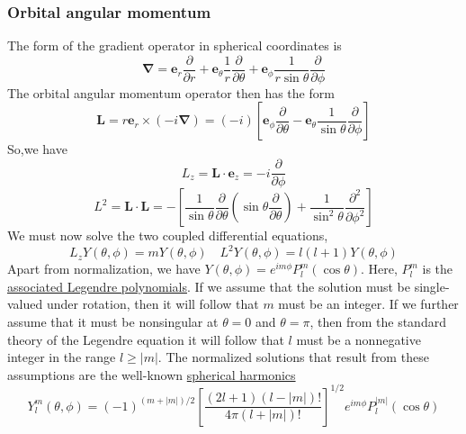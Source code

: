 \documentclass[cyan]{elegantnote}
\begin{document}
\subsubsection{Orbital angular momentum}
The form of the gradient operator in spherical coordinates is
\[\bm{\nabla} = \bm{e}_r \frac{\partial}{\partial r} + \bm{e}_{\theta} \frac{1}{r} \frac{\partial}{\partial \theta} + \bm{e}_{\phi} \frac{1}{r\sin\theta} \frac{\partial}{\partial \phi}\]
The orbital angular momentum operator then has the form
\[\bm{L} = r\bm{e}_r \times (-i\bm{\nabla}) = (-i) \left[ \bm{e}_{\phi} \frac{\partial}{\partial \theta} - \bm{e}_{\theta} \frac{1}{\sin\theta} \frac{\partial}{\partial \phi} \right]\]
So,we have
\[L_z = \bm{L}\cdot\bm{e}_z = -i\frac{\partial}{\partial \phi}\]
\[L^2 = \bm{L}\cdot\bm{L} = - \left [ \frac{1}{\sin\theta} \frac{\partial }{\partial \theta} (\sin\theta \frac{\partial }{\partial \theta}) + \frac{1}{\sin^2\theta} \frac{\partial^2}{\partial \phi^2}  \right ]\]
We must now solve the two coupled differential equations,
\[L_z Y(\theta,\phi) = m Y(\theta,\phi) \quad L^2 Y(\theta,\phi) = l(l+1) Y(\theta,\phi)\]
Apart from normalization, we have $Y(\theta,\phi) = e^{im\phi}P_l^m(\cos\theta)$. Here, $P_l^m$ is the \href{https://en.wikipedia.org/wiki/Associated_Legendre_polynomials}{associated Legendre polynomials}. If we assume that the solution must be single-valued under rotation, then it will follow that $m$ must be an integer. If we further assume that it must be nonsingular at $\theta = 0$ and $\theta = \pi$, then from the standard theory of the Legendre equation it will follow that $l$ must be a nonnegative integer in the range $l \geq |m|$. The normalized solutions that result from these assumptions are the well-known \href{https://en.wikipedia.org/wiki/Spherical_harmonics}{spherical harmonics}
\[Y_l^m(\theta,\phi) = (-1)^{(m+|m|)/2} \left [\frac{(2l+1)(l-|m|)!}{4\pi(l+|m|)!}  \right ]^{1/2}e^{im\phi} P_l^{|m|}(\cos\theta)\]
\end{document}
